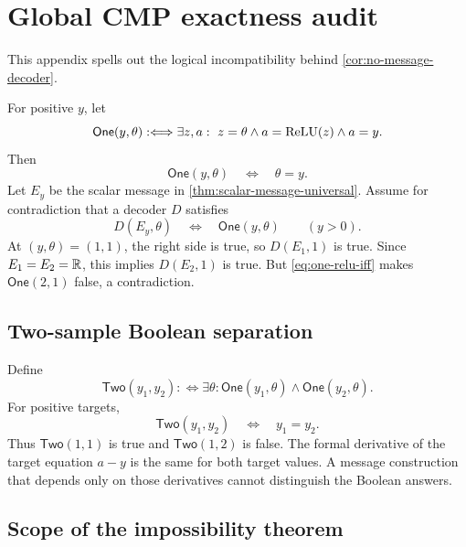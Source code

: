 \section{Global CMP exactness audit}
\label{app:cmp-exactness}

This appendix spells out the logical incompatibility behind
\cref{cor:no-message-decoder}.

For positive \(y\), let
\begin{equation}
 \mathsf{One}(y,\theta)
 :\Longleftrightarrow
 \exists z,a:\ z=\theta\land a=\operatorname{ReLU}(z)\land a=y.
\end{equation}
Then
\begin{equation}
 \mathsf{One}(y,\theta)\quad\Longleftrightarrow\quad\theta=y.
 \label{eq:one-relu-iff}
\end{equation}
Let \(E_y\) be the scalar message in
\cref{thm:scalar-message-universal}.  Assume for contradiction that a decoder
\(D\) satisfies
\begin{equation}
 D(E_y,\theta)\quad\Longleftrightarrow\quad\mathsf{One}(y,\theta)
 \qquad(y>0).
\end{equation}
At \((y,\theta)=(1,1)\), the right side is true, so \(D(E_1,1)\) is true.  Since
\(E_1=E_2=\mathbb{R}\), this implies \(D(E_2,1)\) is true.  But
\cref{eq:one-relu-iff} makes \(\mathsf{One}(2,1)\) false, a contradiction.

\subsection{Two-sample Boolean separation}

Define
\begin{equation}
 \mathsf{Two}(y_1,y_2)
 :\Longleftrightarrow
 \exists\theta:\mathsf{One}(y_1,\theta)
 \land\mathsf{One}(y_2,\theta).
\end{equation}
For positive targets,
\begin{equation}
 \mathsf{Two}(y_1,y_2)\quad\Longleftrightarrow\quad y_1=y_2.
\end{equation}
Thus \(\mathsf{Two}(1,1)\) is true and \(\mathsf{Two}(1,2)\) is false.  The
formal derivative of the target equation \(a-y\) is the same for both target
values.  A message construction that depends only on those derivatives cannot
distinguish the Boolean answers.

\subsection{Scope of the impossibility theorem}

